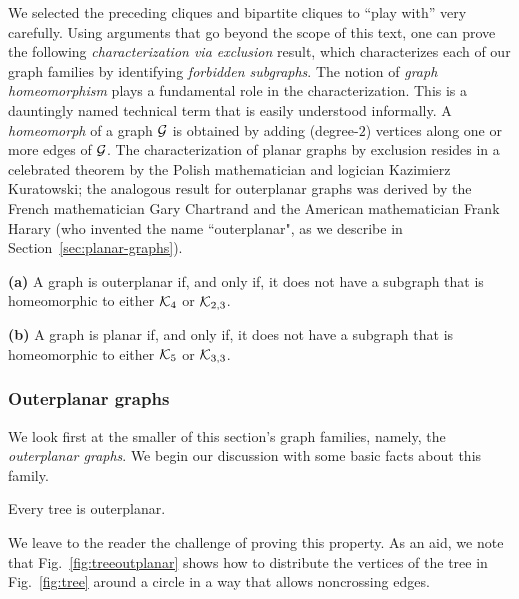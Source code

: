 We selected the preceding cliques and bipartite cliques to ``play
with'' very carefully.  Using arguments that go beyond the scope of
this text, one can prove the following {\em characterization via
  exclusion} result, which characterizes each of our graph families by
identifying {\it forbidden subgraphs}.  
 The
notion of {\it graph homeomorphism} plays a fundamental role in
 the characterization.  This is a
dauntingly named technical term that is easily understood informally.
A {\it homeomorph}  of a graph $\mbox{$\cal G$}$ is
obtained by adding (degree-$2$) vertices along one or more edges of $\mbox{$\cal G$}$.
The characterization of planar graphs by exclusion resides in a
celebrated theorem by the Polish mathematician and logician Kazimierz
Kuratowski;  the analogous result for
outerplanar graphs was derived by the French mathematician Gary
Chartrand  and the American mathematician Frank
Harary (who invented the name ``outerplanar", as
we describe in Section~\ref{sec:planar-graphs}).

\begin{theorem}
\label{thm:planar+outerplanar-exclusion}
{\bf (a)} {\rm \cite{ChartrandB67}}
A graph is outerplanar if, and only if, it does not have a subgraph
that is homeomorphic to either $\mbox{$\cal K$}_4$ or $\mbox{$\cal K$}_{2,3}$.

{\bf (b)} {\rm \cite{Kuratowski30}}
A graph is planar if, and only if, it does not have a subgraph
that is homeomorphic to either $\mbox{$\cal K$}_5$ or $\mbox{$\cal K$}_{3,3}$.
\end{theorem}


\subsubsection{Outerplanar graphs}

We look first at the smaller of this section's graph families, namely,
the {\it outerplanar graphs}. 
We begin our discussion with some basic facts about this family.

\begin{prop}
Every tree is outerplanar.
\end{prop}

We leave to the reader the challenge of proving this property.   As an aid, we note that
Fig.~\ref{fig:treeoutplanar} shows how to distribute the vertices of the tree in Fig.~\ref{fig:tree}
around a circle in a way that allows noncrossing edges.

